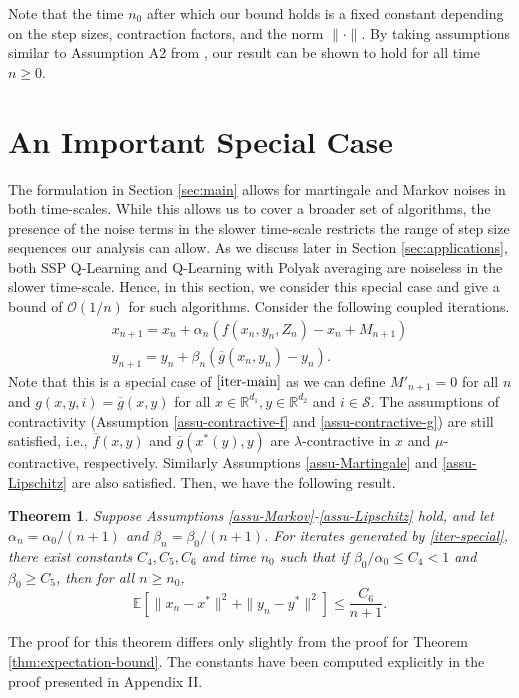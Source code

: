 \documentclass[letterpaper, 10 pt, conference]{ieeeconf}  %
\theoremstyle{definition}
\theoremstyle{plain}
\newtheorem{theorem}{Theorem}
\newcommand{\barf}{\overline{f}}
\newcommand{\barg}{\overline{g}}
\newcommand{\xstar}{x^*}
\newcommand{\ystar}{y^*}
\newcommand{\Scal}{\mathcal{S}}
\newcommand{\RR}{\mathbb{R}}
\newcommand{\EE}{\mathbb{E}}
\begin{document}
Note that the time $n_0$ after which our bound holds is a fixed constant depending on the step sizes, contraction factors, and the norm $\|\cdot\|$. By taking assumptions similar to Assumption A2 from \cite{Kaledin}, our result can be shown to hold for all time $n\geq 0$.  

\section{An Important Special Case}\label{sec:special}
The formulation in Section \ref{sec:main} allows for martingale and Markov noises in both time-scales. While this allows us to cover a broader set of algorithms, the presence of the noise terms in the slower time-scale restricts the range of step size sequences our analysis can allow. As we discuss later in Section \ref{sec:applications}, both SSP Q-Learning and Q-Learning with Polyak averaging are noiseless in the slower time-scale. Hence, in this section, we consider this special case and give a bound of $\mathcal{O}(1/n)$ for such algorithms. Consider the following coupled iterations.
\begin{equation}\label{iter-special}
    \begin{gathered}
x_{n+1}=x_n+\alpha_n (f(x_n,y_n,Z_n)-x_n+M_{n+1})\\
y_{n+1}=y_n+\beta_n (\barg(x_n,y_n)-y_n).
\end{gathered}
\end{equation}
Note that this is a special case of $\eqref{iter-main}$ as we can define $M'_{n+1}=0$ for all $n$ and $g(x,y,i)=\barg(x,y)$ for all $x\in\RR^{d_1}, y\in\RR^{d_2}$ and $i\in\Scal$. The assumptions of contractivity (Assumption \ref{assu-contractive-f} and \ref{assu-contractive-g}) are still satisfied, i.e., $\barf(x,y)$ and $\barg(\xstar(y),y)$ are $\lambda$-contractive in $x$ and $\mu$-contractive, respectively. Similarly Assumptions \ref{assu-Martingale} and \ref{assu-Lipschitz} are also satisfied. Then, we have the following result.
\begin{theorem}\label{thm:expectation-special}
    Suppose Assumptions \ref{assu-Markov}-\ref{assu-Lipschitz} hold, and let $\alpha_n=\alpha_0/(n+1)$ and $\beta_n=\beta_0/(n+1)$. For iterates generated by \eqref{iter-special}, there exist constants $C_4,C_5, C_6$ and time $n_0$ such that if $\beta_0/\alpha_0\leq C_4<1$ and $\beta_0\geq C_5$, then for all $n\geq n_0$, $$\EE[\|x_n-\xstar\|^2+\|y_n-\ystar\|^2]\leq \frac{C_6}{n+1}.$$
    
\end{theorem}
The proof for this theorem differs only slightly from the proof for Theorem \ref{thm:expectation-bound}. The constants have been computed explicitly in the proof presented in Appendix II.
\end{document}
